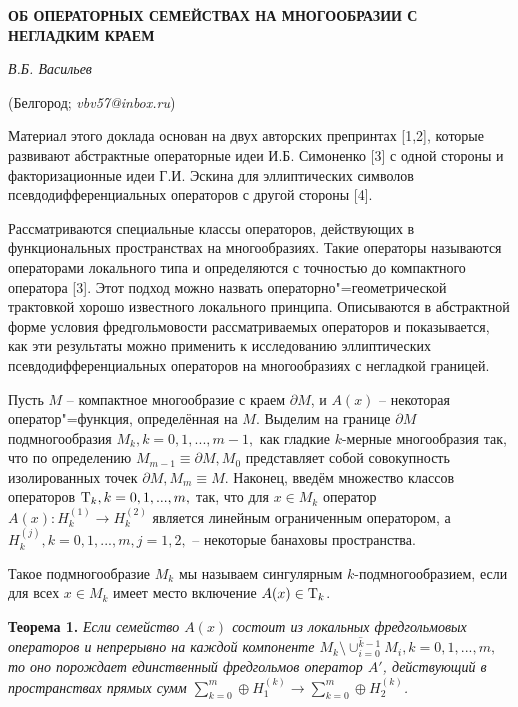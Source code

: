 \begin{center}
    {\bf ОБ ОПЕРАТОРНЫХ СЕМЕЙСТВАХ НА МНОГООБРАЗИИ С НЕГЛАДКИМ КРАЕМ}

    {\it В.Б. Васильев}

    (Белгород; {\it vbv57@inbox.ru})
\end{center}


Материал этого доклада основан на двух авторских препринтах [1,2], которые развивают абстрактные операторные идеи И.Б. Симоненко [3] с одной стороны и факторизационные идеи Г.И. Эскина для эллиптических символов псевдодифференциальных операторов с другой стороны [4].

Рассматриваются специальные классы операторов, действующих в функциональных пространствах на многообразиях. Такие операторы называются операторами локального типа и определяются с точностью до компактного оператора [3]. Этот подход можно назвать операторно"=геометрической трактовкой хорошо известного локального принципа. Описываются в абстрактной форме условия фредгольмовости рассматриваемых операторов и показывается, как эти результаты можно применить к исследованию эллиптических псевдодифференциальных операторов на многообразиях с негладкой границей.

Пусть $M$ -- компактное многообразие с краем $\partial M$, и $A(x)$ -- некоторая оператор"=функция, определённая на $M$. Выделим на границе $\partial M$ подмногообразия $M_k, k=0,1,...,m-1,$ как гладкие $k$-мерные многообразия так, что по определению $M_{m-1}\equiv\partial M, M_0$ представляет собой совокупность изолированных точек $\partial M, M_m\equiv M$. Наконец, введём множество классов операторов ${\rm T}_k, k=0,1,...,m,$ так, что для $x\in M_k$ оператор $A(x): H^{(1)}_k\rightarrow H^{(2)}_k$ является линейным ограниченным оператором, а $H^{(j)}_k, k=0,1,...,m, j=1,2,$ -- некоторые банаховы пространства.


Такое подмногообразие $M_k$ мы называем сингулярным $k$-подмногообразием, если для всех $x\in M_k$ имеет место включение $A(x)\in{\rm T}_k$.

\textbf{Теорема 1.} {\it
Если семейство $A(x)$ состоит из локальных фредгольмовых операторов и непрерывно на каждой компоненте $\overline{M_k\setminus\cup_{i=0}^{k-1}M_i}, k=0,1,...,m,$ то оно порождает единственный фредгольмов оператор
$A'$, действующий в пространствах прямых сумм $\sum\limits_{k=0}^m\oplus H^{(k)}_1\rightarrow\sum\limits_{k=0}^m\oplus H^{(k)}_2$.
}


